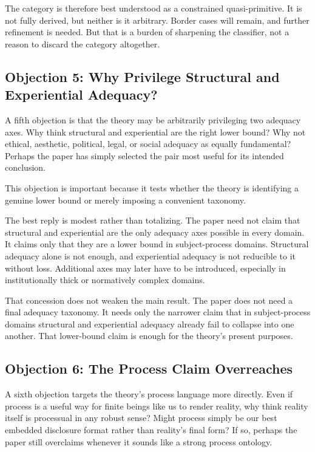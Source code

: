 \documentclass[11pt]{article}
\begin{document}
The category is therefore best understood as a constrained quasi-primitive. It is not fully derived, but neither is it arbitrary. Border cases will remain, and further refinement is needed. But that is a burden of sharpening the classifier, not a reason to discard the category altogether.

\subsection{Objection 5: Why Privilege Structural and Experiential Adequacy?}

A fifth objection is that the theory may be arbitrarily privileging two adequacy axes. Why think structural and experiential are the right lower bound? Why not ethical, aesthetic, political, legal, or social adequacy as equally fundamental? Perhaps the paper has simply selected the pair most useful for its intended conclusion.

This objection is important because it tests whether the theory is identifying a genuine lower bound or merely imposing a convenient taxonomy.

The best reply is modest rather than totalizing. The paper need not claim that structural and experiential are the only adequacy axes possible in every domain. It claims only that they are a lower bound in subject-process domains. Structural adequacy alone is not enough, and experiential adequacy is not reducible to it without loss. Additional axes may later have to be introduced, especially in institutionally thick or normatively complex domains.

That concession does not weaken the main result. The paper does not need a final adequacy taxonomy. It needs only the narrower claim that in subject-process domains structural and experiential adequacy already fail to collapse into one another. That lower-bound claim is enough for the theory's present purposes.

\subsection{Objection 6: The Process Claim Overreaches}

A sixth objection targets the theory's process language more directly. Even if process is a useful way for finite beings like us to render reality, why think reality itself is processual in any robust sense? Might process simply be our best embedded disclosure format rather than reality's final form? If so, perhaps the paper still overclaims whenever it sounds like a strong process ontology.
\end{document}
